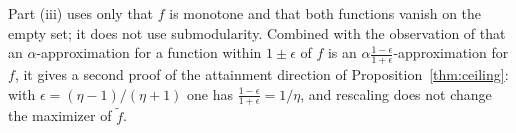 \begin{remark}
Part (iii) uses only that $f$ is monotone and that both functions vanish on the empty set; it does not use submodularity. Combined with the observation of \citet{horel2016} that an $\alpha$-approximation for a function within $1\pm\epsilon$ of $f$ is an $\alpha\frac{1-\epsilon}{1+\epsilon}$-approximation for $f$, it gives a second proof of the attainment direction of Proposition~\ref{thm:ceiling}: with $\epsilon=(\eta-1)/(\eta+1)$ one has $\frac{1-\epsilon}{1+\epsilon}=1/\eta$, and rescaling does not change the maximizer of $\tilde f$.
\end{remark}
